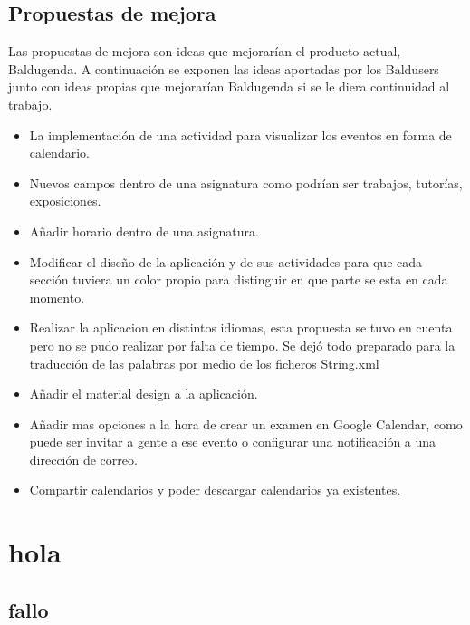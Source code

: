 \section{Propuestas de mejora}

Las propuestas de mejora son ideas que mejorarían el producto actual, Baldugenda.
A continuación se exponen las ideas aportadas por los Baldusers junto con ideas propias que mejorarían Baldugenda si se le diera continuidad al trabajo. 
\begin{itemize}
	\item La implementación de una actividad para visualizar los eventos en forma de calendario.
	\item Nuevos campos dentro de una asignatura como podrían ser trabajos, tutorías, exposiciones.
	\item Añadir horario dentro de una asignatura.
	\item Modificar el diseño de la aplicación y de sus actividades para que cada sección tuviera un color propio para distinguir en que parte se esta en cada momento.
	\item Realizar la aplicacion en distintos idiomas, esta propuesta se tuvo en cuenta pero no se pudo realizar por falta de tiempo. Se dejó todo preparado para la traducción de las palabras por medio de los ficheros String.xml
	\item Añadir el material design a la aplicación.
	\item Añadir mas opciones a la hora de crear un examen en Google Calendar, como puede ser invitar a gente a ese evento o configurar una notificación a una dirección de correo.
	\item Compartir calendarios y poder descargar calendarios ya existentes.
\end{itemize}
\chapter{hola}
\section{fallo}